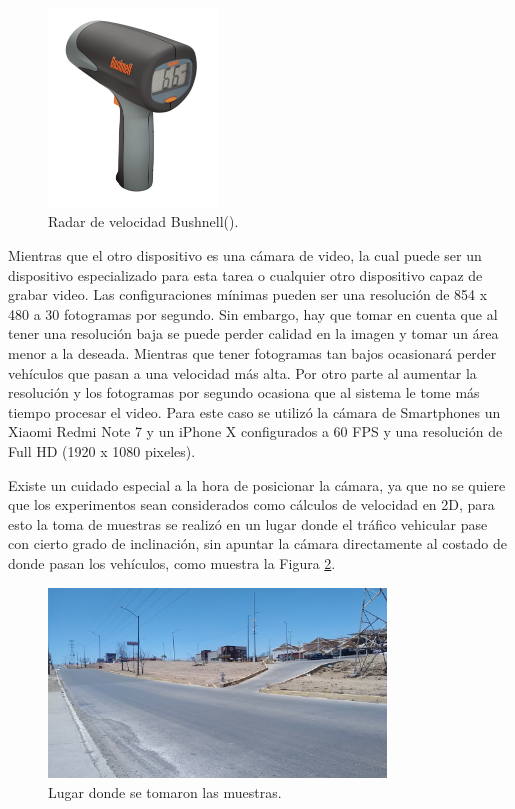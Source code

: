 \begin{figure}[H]
    \centering
    \includegraphics[width=0.4\textwidth]{Metodologia/imgs/bushnell.jpg}
    \caption{Radar de velocidad Bushnell(\cite{bushnell}).}
    \label{fig:RadarVelocidad}
\end{figure}

Mientras que el otro dispositivo es una cámara de video, la cual puede ser un dispositivo especializado para esta tarea o cualquier otro dispositivo capaz de grabar video. 
Las configuraciones mínimas pueden ser una resolución de 854 x 480 a 30 fotogramas por segundo. Sin embargo, hay que tomar en cuenta que al tener una resolución baja se puede perder calidad en la imagen y tomar un área menor a la deseada. Mientras que tener fotogramas tan bajos ocasionará perder vehículos que pasan a una velocidad más alta.
Por otro parte al aumentar la resolución y los fotogramas por segundo ocasiona que al sistema le tome más tiempo procesar el video. Para este caso se utilizó la cámara de Smartphones un Xiaomi Redmi Note 7 y un iPhone X configurados a 60 FPS y una resolución de Full HD (1920 x 1080 pixeles).

Existe un cuidado especial a la hora de posicionar la cámara, ya que no se quiere que los experimentos sean considerados como cálculos de velocidad en 2D, para esto la toma de muestras se realizó en un lugar donde el tráfico vehicular pase con cierto grado de inclinación, sin apuntar la cámara directamente al costado de donde pasan los vehículos, como muestra la Figura \ref{fig:LugarMuestrasDataset}.

\begin{figure}[H]
    \centering
    \includegraphics[width=0.8\textwidth]{Metodologia/imgs/LugarMuestras.jpg}
    \caption{Lugar donde se tomaron las muestras.}
    \label{fig:LugarMuestrasDataset}
\end{figure}

